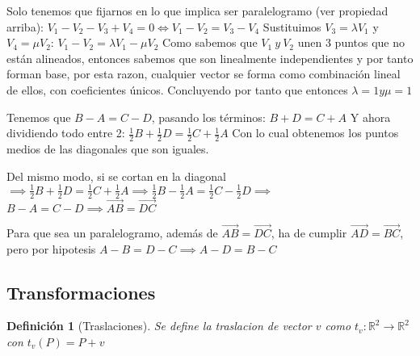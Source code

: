\documentclass[11pt, a4paper, titlepage]{article}
\makeatletter
\renewenvironment{proof}[1][\proofname] {\vspace{-15pt}\par\pushQED{\qed}\normalfont\topsep6\p@\@plus6\p@\relax\trivlist\item[\hskip\labelsep\it#1\@addpunct{.}]\ignorespaces}{\popQED\endtrivlist\@endpefalse}
\newcommand{\R}{\mathbb{R}}
\renewcommand{\vec}{\overrightarrow}
\theoremstyle{theorem-style}
\theoremstyle{definition-style}
\newtheorem*{ndef}{Definición}
\theoremstyle{remark-style}
\theoremstyle{example-style}
\makeatother
\begin{document}
\begin{proof}\hfill
	Solo tenemos que fijarnos en lo que implica ser paralelogramo (ver propiedad arriba):
	$V_{1} - V_{2} - V_{3} + V_{4} = 0 \Leftrightarrow V_{1} - V_{2} = V_{3} - V_{4} $
	Sustituimos $V_{3} = \lambda V_{1}$ y $V_{4} = \mu V_{2}$:
	$V_{1} - V_{2} = \lambda V_{1} - \mu V_{2}$
	Como sabemos que $V_{1}\ y\ V_{2}$ unen 3 puntos que no están alineados, entonces sabemos que son linealmente independientes y por
	tanto forman base, por esta razon, cualquier vector se forma como combinación lineal de ellos, con coeficientes únicos.
	Concluyendo por tanto que entonces $\lambda = 1 y \mu = 1$

	Tenemos que $B - A = C - D$, pasando los términos:
	$B + D = C + A$
	Y ahora dividiendo todo entre 2:
	$\frac{1}{2}B + \frac{1}{2}D = \frac{1}{2}C + \frac{1}{2}A$
	Con lo cual obtenemos los puntos medios de las diagonales que son iguales.

	 Del mismo modo, si se cortan en la diagonal 
	$\implies \frac{1}{2}B + \frac{1}{2}D = \frac{1}{2}C + \frac{1}{2}A \implies 
	\frac{1}{2}B - \frac{1}{2}A = \frac{1}{2}C - \frac{1}{2}D \implies $ $B - A = C - D \implies \vec{AB} = \vec{DC}$
	
	 Para que sea un paralelogramo, además de $\vec{AB} = \vec{DC}$, ha de cumplir $\vec{AD} = \vec{BC}$, pero por hipotesis $A - B = D - C \implies A - D = B - C$
	
\end{proof}

\subsection{Transformaciones}

\begin{ndef}[Traslaciones]
	Se define la traslacion de vector $v$ como $t_v: \R^2 \rightarrow \R^2$ con $t_v(P) = P + v$
\end{ndef}
\end{document}
